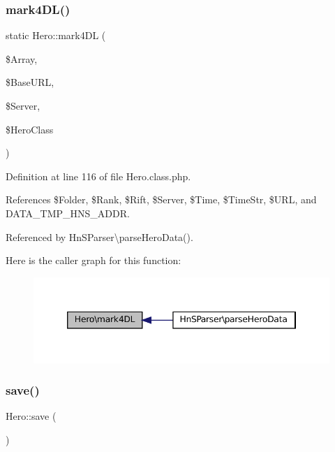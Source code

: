 \subsubsection{\texorpdfstring{mark4\+D\+L()}{mark4DL()}}
{\footnotesize\ttfamily static Hero\+::mark4\+DL (\begin{DoxyParamCaption}\item[{}]{\$\+Array,  }\item[{}]{\$\+Base\+U\+RL,  }\item[{}]{\$\+Server,  }\item[{}]{\$\+Hero\+Class }\end{DoxyParamCaption})\hspace{0.3cm}{\ttfamily [static]}}



Definition at line 116 of file Hero.\+class.\+php.



References \$\+Folder, \$\+Rank, \$\+Rift, \$\+Server, \$\+Time, \$\+Time\+Str, \$\+U\+RL, and D\+A\+T\+A\+\_\+\+T\+M\+P\+\_\+\+H\+N\+S\+\_\+\+A\+D\+DR.



Referenced by Hn\+S\+Parser\textbackslash{}parse\+Hero\+Data().

Here is the caller graph for this function\+:\nopagebreak
\begin{figure}[H]
\begin{center}
\leavevmode
\includegraphics[width=346pt]{class_hero_afedf929b889d53bc2ce666ad5288aca0_icgraph}
\end{center}
\end{figure}
\mbox{\label{class_hero_af901d5ac2e1b888eacef95d42f07a4d8}} 
\subsubsection{\texorpdfstring{save()}{save()}}
{\footnotesize\ttfamily Hero\+::save (\begin{DoxyParamCaption}{ }\end{DoxyParamCaption})}



